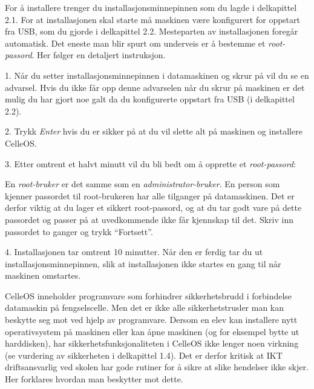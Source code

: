 For \aa{} installere trenger du installasjons\-minnepinnen som du lagde i delkapittel 2.1. For at installasjonen skal starte m\aa{} maskinen v\ae re konfigurert for oppstart fra USB, som du gjorde i delkapittel 2.2. Mesteparten av installasjonen foreg\aa r automatisk. Det eneste man blir spurt om underveis er \aa{} bestemme et {\it root-passord}. Her f\o lger en detaljert instruksjon.
\item{1.} N\aa r du setter installasjonsminnepinnen i datamaskinen og skrur p\aa{} vil du se en advarsel. Hvis du ikke f\aa r opp denne advarselen n\aa r du skrur p\aa{} maskinen er det mulig du har gjort noe galt da du konfigurerte oppstart fra USB (i delkapittel 2.2).
\vskip 1pc
\vskip 1pc
\item{2.} Trykk {\it Enter} hvis du er sikker p\aa{} at du vil slette alt p\aa{} maskinen og installere CelleOS.
\item{3.} Etter omtrent et halvt minutt vil du bli bedt om \aa{} opprette et {\it root-passord}:
\vskip 1pc
\vskip 1pc
\item{} En {\it root-bruker} er det samme som en {\it administrator-bruker}. En person som kjenner passordet til root-brukeren har alle tilganger p\aa{} datamaskinen. Det er derfor viktig at du lager et sikkert root-passord, og at du tar godt vare p\aa{} dette passordet og passer p\aa{} at uvedkommende ikke f\aa r kjennskap til det. Skriv inn passordet to ganger og trykk ``Fortsett''.
\item{4.} Installasjonen tar omtrent 10 minutter. N\aa r den er ferdig tar du ut installasjonsminnepinnen, slik at installasjonen ikke startes en gang til n\aa r maskinen omstartes.

\vfill\eject
\topglue 1pc

CelleOS inneholder programvare som forhindrer sikkerhetsbrudd i forbindelse datamaskin p\aa{} fengselscelle. Men det er ikke alle sikkerhetstrusler man kan beskytte seg mot ved hjelp av programvare. Dersom en elev kan installere nytt operativsystem p\aa{} maskinen eller kan \aa pne maskinen (og for eksempel bytte ut harddisken), har sikkerhetsfunksjonaliteten i CelleOS ikke lenger noen virkning (se vurdering av sikkerheten i delkapittel 1.4). Det er derfor kritisk at IKT driftsansvarlig ved skolen har gode rutiner for \aa{} sikre at slike hendelser ikke skjer. Her forklares hvordan man beskytter mot dette.

